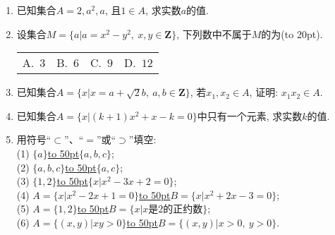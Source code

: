 \documentclass[10pt,a4paper]{article}
\newcommand{\blank}[1]{\underline{\hbox to #1pt{}}}
\newcommand{\bracket}[1]{(\hbox to #1pt{})}
\newcommand{\fourch}[4]{\par\begin{tabular}{p{.23\textwidth}p{.23\textwidth}p{.23\textwidth}p{.23\textwidth}}
A.~#1 &B.~#2& C.~#3& D.~#4
\end{tabular}}
\begin{document}
\begin{enumerate}[1.]
\item 已知集合$A={2, a^2, a}$, 且$1\in A$, 求实数$a$的值.
\item 设集合$M=\{a|a=x^2-y^2, \ x,y\in\mathbf{Z}\}$, 下列数中不属于$M$的为\bracket{20}.
\fourch{$3$}{$6$}{$9$}{$12$}
\item 已知集合$A=\{x|x=a+\sqrt 2b,\ a,b\in \mathbf{Z}\}$, 若$x_1,x_2\in A$, 证明: $x_1x_2\in A$.
\item 已知集合$A=\{x|(k+1)x^2+x-k=0\}$中只有一个元素, 求实数$k$的值.
\item 用符号``$\subset$''、``$=$''或``$\supset$''填空:\\
(1) $\{a\}$\blank{50}$\{a, b, c\}$;\\
(2) $\{a, b, c\}$\blank{50}$\{a, c\}$;\\
(3) $\{1, 2\}$\blank{50}$\{x|x^2-3x+2=0\}$;\\
(4) $A=\{x|x^2-2x+1=0\}$\blank{50}$B=\{x|x^2+2x-3=0\}$;\\
(5) $A=\{1, 2\}$\blank{50}$B=\{x|x$是$2$的正约数$\}$;\\
(6) $A=\{(x, y)|xy>0\}$\blank{50}$B=\{(x, y)|x>0, \ y>0\}$.

\iffalse





\end{enumerate}
\end{document}
